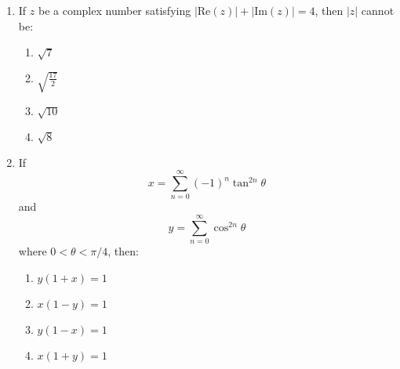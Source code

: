 \documentclass[journal]{IEEEtran}
\numberwithin{equation}{enumi}
\numberwithin{figure}{enumi}
\begin{document}
\begin{enumerate}
        \begin{enumerate}
        \item $\frac{1}{2}\left(\frac{\sqrt{5}}{3}\right)$
        \item $\frac{1}{2}\sqrt{\frac{11}{3}}$
        \item $\sqrt{\frac{5}{6}}$
        \item $\frac{1}{3}\sqrt{\frac{11}{3}}$
        \end{enumerate}  

    \item If $z$ be a complex number satisfying $|\text{Re}(z)|+|\text{Im}(z)|=4$, then $|z|$ cannot be:

        \begin{enumerate}
        \item $\sqrt{7}$
        \item $\sqrt{\frac{17}{2}}$
        \item $\sqrt{10}$
        \item $\sqrt{8}$
        \end{enumerate}

    \item If        
        \[x=\sum_{n=0}^{\infty}(-1)^{n}\tan^{2n}\theta\]  
        and
        \[y=\sum_{n=0}^{\infty}\cos^{2n}\theta\]
        where $0<\theta<\pi/4$, then:
        
        \begin{enumerate}
        \item $y(1+x)=1$
        \item $x(1-y)=1$
        \item $y(1-x)=1$
        \item $x(1+y)=1$
        \end{enumerate}

    
\end{enumerate}
\end{document}
